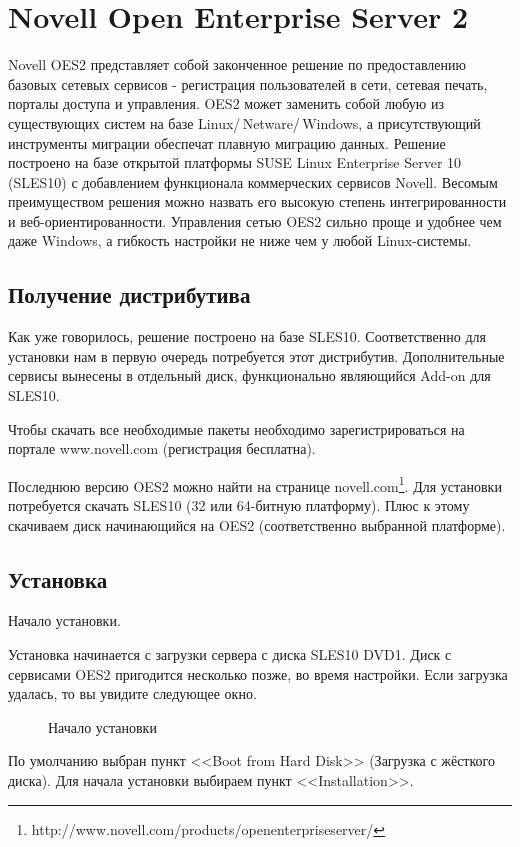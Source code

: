 \part{Novell Open Enterprise Server 2}
Novell OES2 представляет собой законченное решение по предоставлению базовых сетевых сервисов - регистрация пользователей в сети, сетевая печать, порталы доступа и управления. OES2 может заменить собой любую из существующих систем на базе Linux/\,Netware/\,Windows, а присутствующий инструменты миграции обеспечат плавную миграцию данных. Решение построено на базе открытой платформы SUSE Linux Enterprise Server 10 (SLES10) с добавлением функционала коммерческих сервисов Novell. Весомым преимуществом решения можно назвать его высокую степень интегрированности и веб-ориентированности. Управления сетью OES2 сильно проще и удобнее чем даже Windows, а гибкость настройки не ниже чем у любой Linux-системы.

\chapter{Получение дистрибутива}
Как уже говорилось, решение построено на базе SLES10. Соответственно для установки нам в первую очередь потребуется этот дистрибутив. Дополнительные сервисы вынесены в отдельный диск, функционально являющийся Add-on для SLES10.\par
Чтобы скачать все необходимые пакеты необходимо зарегистрироваться на портале www.novell.com (регистрация бесплатна).\par
Последнюю версию OES2 можно найти на странице novell.com\footnote{http://www.novell.com/products/openenterpriseserver/}. Для установки потребуется скачать SLES10 (32 или 64-битную платформу). Плюс к этому скачиваем диск начинающийся на OES2 (соответственно выбранной платформе).
\clearpage

\chapter{Установка}
Начало установки.\par
Установка начинается с загрузки сервера с диска SLES10 DVD1. Диск с сервисами OES2 пригодится несколько позже, во время настройки. Если загрузка удалась, то вы увидите следующее окно.
\begin{figure}[H]
\caption{Начало установки}
\label{fig1}
\end{figure}
По умолчанию выбран пункт <<Boot from Hard Disk>> (Загрузка с жёсткого диска). Для начала установки выбираем пункт <<Installation>>.
\clearpage

